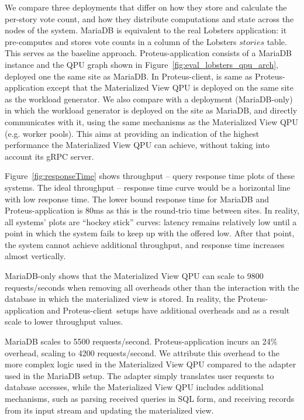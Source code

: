 We compare three deployments that differ on how they store and calculate the per-story vote count,
and how they distribute computations and state across the nodes of the system.
MariaDB is equivalent to the real Lobsters application:
it pre-computes and stores vote counts in a column of the Lobsters $stories$ table.
This serves as the baseline approach.
Proteus-application consists of a MariaDB instance and the QPU graph shown in Figure~\ref{fig:eval_lobsters_qpu_arch},
deployed one the same site as MariaDB.
In Proteus-client, is same as Proteus-application except that the Materialized View QPU is deployed on the same site as
the workload generator.
We also compare with a deployment (MariaDB-only) in which the workload generator is deployed on the site as MariaDB,
and directly communicates with it, using the same mechanisms as the Materialized View QPU (e.g. worker pools).
This aims at providing an indication of the highest performance the Materialized View QPU can achieve,
without taking into account its gRPC server.

Figure~\ref{fig:responseTime} shows throughput -- query response time plots of these systems.
The ideal throughput -- response time curve would be a horizontal line with low response time.
The lower bound response time for MariaDB and Proteus-application is 80ms as this is the round-trio time between sites.
In reality, all systems' plots are ``hockey stick'' curves:
latency remains relatively low until a point in which the system fails to keep up with the offered low.
After that point, the system cannot achieve additional throughput, and response time increases almost vertically.

MariaDB-only shows that the Materialized View QPU can scale to 9800 requests/seconds when removing all overheads other
than the interaction with the database in which the materialized view is stored.
In reality, the Proteus-application and Proteus-client setups have additional overheads and as a result scale to lower
throughput values.

MariaDB scales to 5500 requests/second.
Proteus-application incurs an 24\% overhead, scaling to 4200 requests/second.
We attribute this overhead to the more complex logic used in the Materialized View QPU compared to the adapter used
in the MariaDB setup.
The adapter simply translates user requests to database accesses,
while the Materialized View QPU includes additional mechanisms, such as parsing received queries in SQL form,
and receiving records from its input stream and updating the materialized view.

